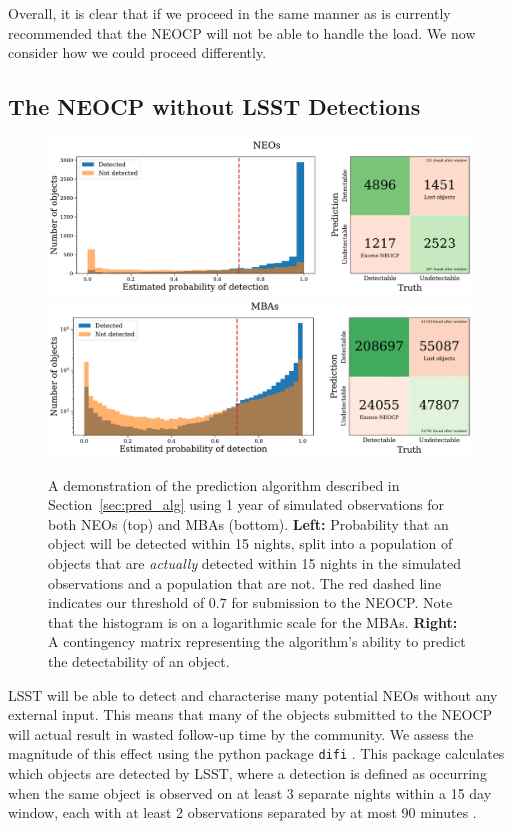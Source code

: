 \documentclass[twocolumn]{aastex631}
\newcommand{\thresholdAlg}{0.7}
\begin{document}
Overall, it is clear that if we proceed in the same manner as is currently recommended that the NEOCP will not be able to handle the load. We now consider how we could proceed differently.

\subsection{The NEOCP without LSST Detections}\label{sec:no_LSST_detections}

\begin{figure}[htb]
    \centering
    \includegraphics[width=\textwidth]{contingency_neo.pdf}
    \includegraphics[width=\textwidth]{contingency_mba.pdf}
    \caption{A demonstration of the prediction algorithm described in Section~\ref{sec:pred_alg} using 1 year of simulated observations for both NEOs (top) and MBAs (bottom). \textbf{Left:} Probability that an object will be detected within 15 nights, split into a population of objects that are \textit{actually} detected within 15 nights in the simulated observations and a population that are not. The red dashed line indicates our threshold of $\thresholdAlg{}$ for submission to the NEOCP. Note that the histogram is on a logarithmic scale for the MBAs. \textbf{Right:} A contingency matrix representing the algorithm's ability to predict the detectability of an object.}
    \label{fig:contingency}
\end{figure}

LSST will be able to detect and characterise many potential NEOs without any external input. This means that many of the objects submitted to the NEOCP will actual result in wasted follow-up time by the community. We assess the magnitude of this effect using the python package \texttt{difi} \citep{difi}. This package calculates which objects are detected by LSST, where a detection is defined as occurring when the same object is observed on at least 3 separate nights within a 15 day window, each with at least 2 observations separated by at most 90 minutes \citep{oss}.
\end{document}

